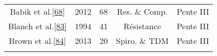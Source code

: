 \documentclass[12pt,]{article}
\begin{document}
\begin{landscape}
\begin{longtable}[]{@{}cllcc@{}}
\begin{minipage}[t]{0.31\columnwidth}
Babik et al.{[}\protect\hyperlink{ref-babik2012effects}{68}{]}\strut
\end{minipage} & \begin{minipage}[t]{0.05\columnwidth}\raggedright
2012\strut
\end{minipage} & \begin{minipage}[t]{0.06\columnwidth}\raggedright
68\strut
\end{minipage} & \begin{minipage}[t]{0.12\columnwidth}\centering
Res. \& Comp.\strut
\end{minipage} & \begin{minipage}[t]{0.32\columnwidth}\centering
Pente III\strut
\end{minipage}\tabularnewline
\begin{minipage}[t]{0.31\columnwidth}\centering
Blanch et
al.{[}\protect\hyperlink{ref-blanch1994relationship}{83}{]}\strut
\end{minipage} & \begin{minipage}[t]{0.05\columnwidth}\raggedright
1994\strut
\end{minipage} & \begin{minipage}[t]{0.06\columnwidth}\raggedright
41\strut
\end{minipage} & \begin{minipage}[t]{0.12\columnwidth}\centering
Résistance\strut
\end{minipage} & \begin{minipage}[t]{0.32\columnwidth}\centering
Pente III\strut
\end{minipage}\tabularnewline
\begin{minipage}[t]{0.31\columnwidth}\centering
Brown et al.{[}\protect\hyperlink{ref-brown2013forced}{84}{]}\strut
\end{minipage} & \begin{minipage}[t]{0.05\columnwidth}\raggedright
2013\strut
\end{minipage} & \begin{minipage}[t]{0.06\columnwidth}\raggedright
20\strut
\end{minipage} & \begin{minipage}[t]{0.12\columnwidth}\centering
Spiro. \& TDM\strut
\end{minipage} & \begin{minipage}[t]{0.32\columnwidth}\centering
Pente III\strut
\end{minipage}\tabularnewline
\begin{minipage}[t]{0.31\columnwidth}\centering

\end{minipage}
\end{longtable}
\end{landscape}
\end{document}
